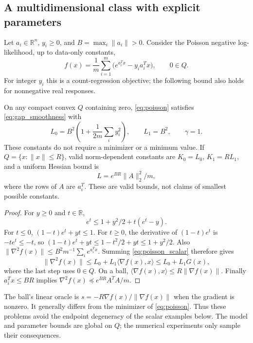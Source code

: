 \subsection{A multidimensional class with explicit parameters}
Let $a_i\in\mathbb R^n$, $y_i\ge0$, and $B=\max_i\|a_i\|>0$.
Consider the Poisson negative log-likelihood, up to data-only constants,
\begin{equation}\label{eq:poisson}
 f(x)=\frac1m\sum_{i=1}^m\bigl(e^{a_i^Tx}-y_i a_i^Tx\bigr),
 \qquad 0\in Q.
\end{equation}
For integer $y_i$ this is a count-regression objective; the following
bound also holds for nonnegative real responses.

\begin{proposition}\label{prop:poisson}
On any compact convex $Q$ containing zero, \eqref{eq:poisson} satisfies
\eqref{eq:gap_smoothness} with
\begin{equation}\label{eq:poisson_constants}
 L_0=B^2\left(1+\frac{1}{2m}\sum_i y_i^2\right),
 \qquad L_1=B^2,\qquad \gamma=1.
\end{equation}
These constants do not require a minimizer or a minimum value.
If $Q=\{x:\|x\|\le R\}$, valid norm-dependent constants are
$K_0=L_0$, $K_1=RL_1$, and a uniform Hessian bound is
\begin{equation}\label{eq:poisson_uniform}
 L=e^{BR}\|A\|_2^2/m,
\end{equation}
where the rows of $A$ are $a_i^T$. These are valid bounds, not claims
of smallest possible constants.
\end{proposition}
\begin{proof}
For $y\ge0$ and $t\in\mathbb R$,
\begin{equation}\label{eq:poisson_scalar}
 e^t\le 1+y^2/2+t(e^t-y).
\end{equation}
For $t\le0$, $(1-t)e^t+yt\le1$.
For $t\ge0$, the derivative of $(1-t)e^t$ is $-te^t\le-t$, so
$(1-t)e^t+yt\le1-t^2/2+yt\le1+y^2/2$.
Also $\|\nabla^2f(x)\|\le B^2m^{-1}\sum_i e^{a_i^Tx}$.
Summing \eqref{eq:poisson_scalar} therefore gives
\[
 \|\nabla^2f(x)\|\le L_0+L_1\langle\nabla f(x),x\rangle
 \le L_0+L_1G(x),
\]
where the last step uses $0\in Q$.
On a ball, $\langle\nabla f(x),x\rangle\le R\|\nabla f(x)\|$.
Finally $a_i^Tx\le BR$ implies
$\nabla^2f(x)\preceq e^{BR}A^TA/m$.
\end{proof}
The ball's linear oracle is $s=-R\nabla f(x)/\|\nabla f(x)\|$
when the gradient is nonzero. It generally differs from the minimizer
of \eqref{eq:poisson}. Thus these problems avoid the endpoint degeneracy
of the scalar examples below. The model and parameter bounds are global
on $Q$; the numerical experiments only sample their consequences.
